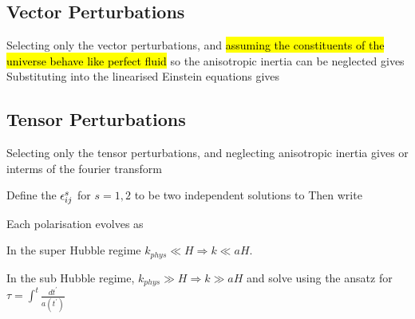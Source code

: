 \documentclass{article}
\begin{document}
\subsection{Vector Perturbations}
Selecting only the vector perturbations, and \hl{assuming the constituents of the universe behave like perfect fluid} so the anisotropic inertia can be neglected gives 
Substituting into the linearised Einstein equations gives 

\subsection{Tensor Perturbations}
Selecting only the tensor perturbations, and neglecting anisotropic inertia gives 
or interms of the fourier transform 

\begin{definition}
Define the  $\epsilon_{ij}^s$ for $s=1,2$ to be two independent solutions to 
Then write 
\end{definition}

Each polarisation evolves as 

In the super Hubble regime $k_{phys} \ll H \Rightarrow k \ll aH$. 

In the sub Hubble regime, $k_{phys} \gg H \Rightarrow k \gg aH$ and solve using the ansatz 
for $\tau = \int^t \frac{dt^\prime}{a(t^\prime)}$
\end{document}
